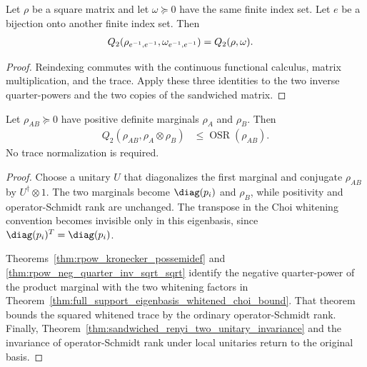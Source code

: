 \begin{theorem}
    \label{thm:sandwiched_renyi_two_submatrix_equiv}
    \leanok
    Let $\rho$ be a square matrix and let $\omega\succeq0$ have the same finite
    index set. Let $e$ be a bijection onto another finite index set. Then
    \begin{align}
        Q_2(\rho_{e^{-1},e^{-1}},\omega_{e^{-1},e^{-1}})
         & =Q_2(\rho,\omega).
        \notag
    \end{align}
\end{theorem}

\begin{proof}\leanok
    Reindexing commutes with the continuous functional calculus, matrix
    multiplication, and the trace. Apply these three identities to the two
    inverse quarter-powers and the two copies of the sandwiched matrix.
\end{proof}

\begin{theorem}
    \label{thm:sandwiched_renyi_two_osr_faithful}
    \leanok
    Let $\rho_{AB}\succeq0$ have positive definite marginals $\rho_A$ and
    $\rho_B$. Then
    \begin{align}
        Q_2(\rho_{AB},\rho_A\otimes\rho_B)
         & \leq\operatorname{OSR}(\rho_{AB}).
        \label{eq:mpdo_faithful_q2_osr}
    \end{align}
    No trace normalization is required.
\end{theorem}

\begin{proof}\leanok
    Choose a unitary $U$ that diagonalizes the first marginal and conjugate
    $\rho_{AB}$ by $U^\dagger\otimes1$. The two marginals become
    $\diag(p_i)$ and $\rho_B$, while positivity and operator-Schmidt rank are
    unchanged. The transpose in the Choi whitening convention becomes
    invisible only in this eigenbasis, since $\diag(p_i)^T=\diag(p_i)$.

    Theorems~\ref{thm:rpow_kronecker_possemidef} and
    \ref{thm:rpow_neg_quarter_inv_sqrt_sqrt} identify the negative
    quarter-power of the product marginal with the two whitening factors in
    Theorem~\ref{thm:full_support_eigenbasis_whitened_choi_bound}. That theorem
    bounds the squared whitened trace by the ordinary operator-Schmidt rank.
    Finally, Theorem~\ref{thm:sandwiched_renyi_two_unitary_invariance} and the
    invariance of operator-Schmidt rank under local unitaries return
    to the original basis.
\end{proof}

